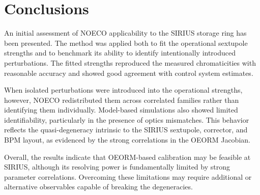 \documentclass[%
               ]{jacow}
\begin{document}
\section{Conclusions}


An initial assessment of NOECO applicability to the SIRIUS storage ring has been presented. The method was applied both to fit the operational sextupole strengths and to benchmark its ability to identify intentionally introduced perturbations. The fitted strengths reproduced the measured chromaticities with reasonable accuracy and showed good agreement with control system estimates.

When isolated perturbations were introduced into the operational strengths, however, NOECO redistributed them across correlated families rather than identifying them individually. Model-based simulations also showed limited identifiability, particularly in the presence of optics mismatches. This behavior reflects the quasi-degeneracy intrinsic to the SIRIUS sextupole, corrector, and BPM layout, as evidenced by the strong correlations in the OEORM Jacobian.

Overall, the results indicate that OEORM-based calibration may be feasible at SIRIUS, although its resolving power is fundamentally limited by strong parameter correlations. Overcoming these limitations may require additional or alternative observables capable of breaking the degeneracies.
\end{document}
